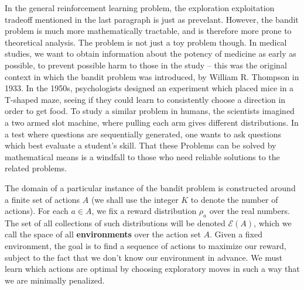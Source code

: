 In the general reinforcement learning problem, the exploration exploitation tradeoff mentioned in the last paragraph is just as prevelant. However, the bandit problem is much more mathematically tractable, and is therefore more prone to theoretical analysis. The problem is not just a toy problem though. In medical studies, we want to obtain information about the potency of medicine as early as possible, to prevent possible harm to those in the study -- this was the original context in which the bandit problem was introduced, by William R. Thompson in 1933. In the 1950s, psychologists designed an experiment which placed mice in a T-shaped maze, seeing if they could learn to consistently choose a direction in order to get food. To study a similar problem in humans, the scientists imagined a two armed slot machine, where pulling each arm gives different distributions. In a test where questions are sequentially generated, one wants to ask questions which best evaluate a student's skill. That these Problems can be solved by mathematical means is a windfall to those who need reliable solutions to the related problems.

The domain of a particular instance of the bandit problem is constructed around a finite set of actions $A$ (we shall use the integer $K$ to denote the number of actions). For each $a \in A$, we fix a reward distribution $\rho_a$ over the real numbers. The set of all collections of such distributions will be denoted $\mathcal{E}(A)$, which we call the space of all {\bf environments} over the action set $A$. Given a fixed environment, the goal is to find a sequence of actions to maximize our reward, subject to the fact that we don't know our environment in advance. We must learn which actions are optimal by choosing exploratory moves in such a way that we are minimally penalized.

